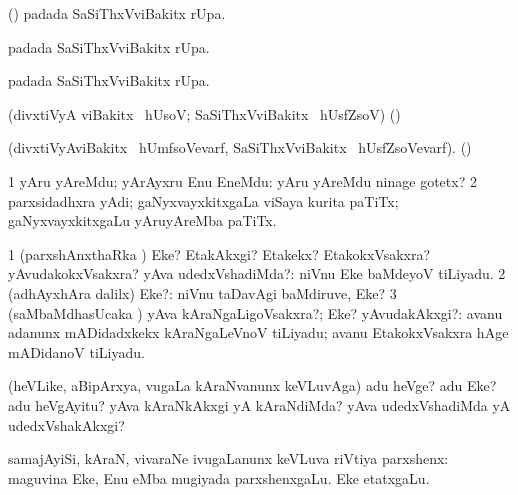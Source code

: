 {{{{{{\bentry
{}
  \gl{\sanA}\bmng
(\pArxparx)  padada SaSiThxVviBakitx rUpa. 
\emng
\eentry

\bentry
{}
  \gl{\sanA}\bmng
{} padada SaSiThxVviBakitx rUpa. 
\emng
\eentry

\bentry
{}
  \gl{\sanA}\bmng
{} padada SaSiThxVviBakitx rUpa. 
\emng
\eentry

\bentry
{}
  \gl{\sanA} \bmng
(divxtiVyA viBakitx  \ucAcx\ hUsoV; SaSiThxVviBakitx  \ucAcx\ hUsfZsoV) (\pArxparx)  
\emng
\eentry

\bentry
{}
  \gl{\sanA}\bmng
(divxtiVyAviBakitx  \ucAcx\ hUmfsoVevarf, SaSiThxVviBakitx  \ucAcx\ hUsfZsoVevarf). (\pArxparx)  
\emng
\eentry

\bentry
{}
\gl{\nA}
\bmng
\bnum
\num{1} yAru yAreMdu; yArAyxru Enu EneMdu:  yAru yAreMdu ninage gotetx? 
\num{2} parxsidadhxra yAdi; gaNyxvayxkitxgaLa viSaya kurita paTiTx; gaNyxvayxkitxgaLu yAruyAreMba paTiTx. 
\enum
\emng
\eentry

\bentry
{} 
\gl{\kirxvi}
\expl{}
\bmng
\bnum
\num{1} (parxshAnxthaRka \kirxvi) Eke? EtakAkxgi? Etakekx? EtakokxVsakxra? yAvudakokxVsakxra? yAva udedxVshadiMda?:  niVnu Eke baMdeyoV tiLiyadu. 
\num{2} (adhAyxhAra \parx dalilx) Eke?:  niVnu taDavAgi baMdiruve, Eke? 
\num{3} (saMbaMdhasUcaka \kirxvi) yAva kAraNgaLigoVsakxra?; Eke? yAvudakAkxgi?:  avanu adanunx mADidadxkekx kAraNgaLeVnoV tiLiyadu; avanu EtakokxVsakxra hAge mADidanoV tiLiyadu. 
\enum
\emng

\noindent 
\gl{\pagu}
\bmng
{} (heVLike, aBipArxya, \mo vugaLa kAraNvanunx keVLuvAga) adu heVge? adu Eke? adu heVgAyitu? yAva kAraNkAkxgi yA kAraNdiMda? yAva udedxVshadiMda yA udedxVshakAkxgi? 
\emng
\eentry

\bentry
{} 
\gl{\nA}
\bmng
 samajAyiSi, kAraN, vivaraNe ivugaLanunx keVLuva riVtiya parxshenx:  maguvina Eke, Enu eMba mugiyada parxshenxgaLu.  Eke etatxgaLu. 
\emng
\eentry

}}}}}}
